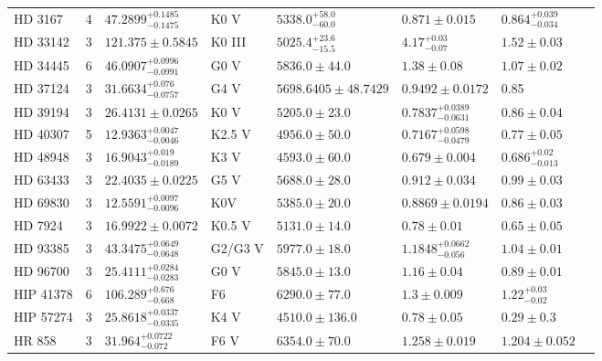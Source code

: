 \begin{tabular}{lrllllll}
HD 3167 & 4 & $47.2899^{+0.1485}_{-0.1475}$ & K0 V & $5338.0^{+58.0}_{-60.0}$ & $0.871 \pm 0.015$ & $0.864^{+0.039}_{-0.034}$ & \cite{COY_ET_AL_2026} \\
HD 33142 & 3 & $121.375 \pm 0.5845$ & K0 III & $5025.4^{+23.6}_{-15.5}$ & $4.17^{+0.03}_{-0.07}$ & $1.52 \pm 0.03$ & \cite{TRIFONOV_ET_AL_2022} \\
HD 34445 & 6 & $46.0907^{+0.0996}_{-0.0991}$ & G0 V & $5836.0 \pm 44.0$ & $1.38 \pm 0.08$ & $1.07 \pm 0.02$ & \cite{VOGT_ET_AL__2017} \\
HD 37124 & 3 & $31.6634^{+0.076}_{-0.0757}$ & G4 V & $5698.6405 \pm 48.7429$ & $0.9492 \pm 0.0172$ & 0.85 & \cite{ROSENTHAL_ET_AL__2021} \\
HD 39194 & 3 & $26.4131 \pm 0.0265$ & K0 V & $5205.0 \pm 23.0$ & $0.7837^{+0.0389}_{-0.0631}$ & $0.86 \pm 0.04$ & \cite{UNGER_ET_AL__2021} \\
HD 40307 & 5 & $12.9363^{+0.0047}_{-0.0046}$ & K2.5 V & $4956.0 \pm 50.0$ & $0.7167^{+0.0598}_{-0.0479}$ & $0.77 \pm 0.05$ & \cite{TUOMI_ET_AL__2013} \\
HD 48948 & 3 & $16.9043^{+0.019}_{-0.0189}$ & K3 V & $4593.0 \pm 60.0$ & $0.679 \pm 0.004$ & $0.686^{+0.02}_{-0.013}$ & \cite{DALAL_ET_AL__2024} \\
HD 63433 & 3 & $22.4035 \pm 0.0225$ & G5 V & $5688.0 \pm 28.0$ & $0.912 \pm 0.034$ & $0.99 \pm 0.03$ & \cite{CAPISTRANT_ET_AL_2024} \\
HD 69830 & 3 & $12.5591^{+0.0097}_{-0.0096}$ & K0V & $5385.0 \pm 20.0$ & $0.8869 \pm 0.0194$ & $0.86 \pm 0.03$ & \cite{LOVIS_ET_AL__2006} \\
HD 7924 & 3 & $16.9922 \pm 0.0072$ & K0.5 V & $5131.0 \pm 14.0$ & $0.78 \pm 0.01$ & $0.65 \pm 0.05$ & \cite{STASSUN_ET_AL__2017} \\
HD 93385 & 3 & $43.3475^{+0.0649}_{-0.0648}$ & G2/G3 V & $5977.0 \pm 18.0$ & $1.1848^{+0.0662}_{-0.056}$ & $1.04 \pm 0.01$ & \cite{UNGER_ET_AL__2021} \\
HD 96700 & 3 & $25.4111^{+0.0284}_{-0.0283}$ & G0 V & $5845.0 \pm 13.0$ & $1.16 \pm 0.04$ & $0.89 \pm 0.01$ & \cite{UNGER_ET_AL__2021} \\
HIP 41378 & 6 & $106.289^{+0.676}_{-0.668}$ & F6 & $6290.0 \pm 77.0$ & $1.3 \pm 0.009$ & $1.22^{+0.03}_{-0.02}$ & \cite{LUND_ET_AL_2019} \\
HIP 57274 & 3 & $25.8618^{+0.0337}_{-0.0335}$ & K4 V & $4510.0 \pm 136.0$ & $0.78 \pm 0.05$ & $0.29 \pm 0.3$ & \cite{STASSUN_ET_AL__2017} \\
HR 858 & 3 & $31.964^{+0.0722}_{-0.072}$ & F6 V & $6354.0 \pm 70.0$ & $1.258 \pm 0.019$ & $1.204 \pm 0.052$ & \cite{BONFANTI_ET_AL__2025} \\

\end{tabular}
